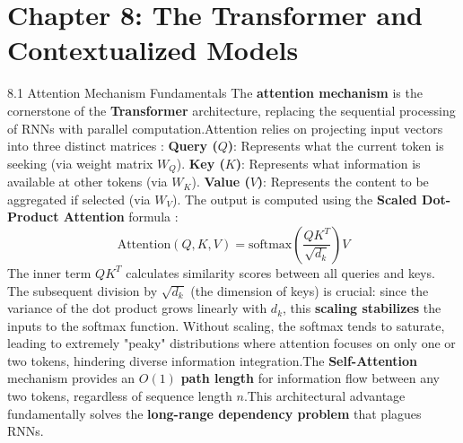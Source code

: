\documentclass{article}
\begin{document}
\section{Chapter 8: The Transformer and Contextualized Models}
8.1 Attention Mechanism Fundamentals
The \textbf{attention mechanism} is the cornerstone of the \textbf{Transformer} architecture, replacing the sequential processing of RNNs with parallel computation.\footnotemark[1] Attention relies on projecting input vectors into three distinct matrices \footnotemark[1]:
\textbf{Query ($Q$)}: Represents what the current token is seeking (via weight matrix $W_Q$).
\textbf{Key ($K$)}: Represents what information is available at other tokens (via $W_K$).
\textbf{Value ($V$)}: Represents the content to be aggregated if selected (via $W_V$).
The output is computed using the \textbf{Scaled Dot-Product Attention} formula \footnotemark[1]:
$$\text{Attention}(Q, K, V) = \text{softmax}\left(\frac{QK^T}{\sqrt{d_k}}\right)V$$
The inner term $QK^T$ calculates similarity scores between all queries and keys. The subsequent division by $\sqrt{d_k}$ (the dimension of keys) is crucial: since the variance of the dot product grows linearly with $d_k$, this \textbf{scaling stabilizes} the inputs to the softmax function. Without scaling, the softmax tends to saturate, leading to extremely "peaky" distributions where attention focuses on only one or two tokens, hindering diverse information integration.\footnotemark[1]
The \textbf{Self-Attention} mechanism provides an $O(1)$ \textbf{path length} for information flow between any two tokens, regardless of sequence length $n$.\footnotemark[1] This architectural advantage fundamentally solves the \textbf{long-range dependency problem} that plagues RNNs.
\end{document}
